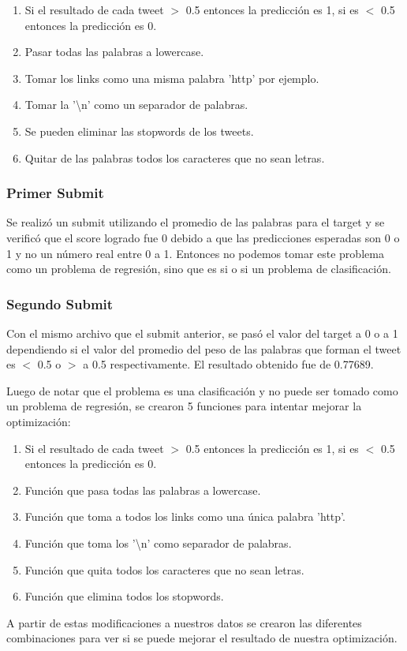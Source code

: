 \documentclass[12pt]{article}
\begin{document}
\begin{enumerate}
  \item Si el resultado de cada tweet $>$ 0.5 entonces la predicción es 1, si es $<$ 0.5 entonces la predicción es 0.
  \item Pasar todas las palabras a lowercase.
  \item Tomar los links como una misma palabra 'http' por ejemplo.
  \item Tomar la '\textbackslash n' como un separador de palabras.
  \item Se pueden eliminar las stopwords de los tweets.
  \item Quitar de las palabras todos los caracteres que no sean letras.
\end{enumerate}

\subsubsection{Primer Submit}
Se realizó un submit utilizando el promedio de las palabras para el target y se verificó que el score logrado fue 0 debido a que las predicciones esperadas son 0 o 1 y no un número real entre 0 a 1.
Entonces no podemos tomar este problema como un problema de regresión, sino que es si o si un problema de clasificación.

\subsubsection{Segundo Submit}
Con el mismo archivo que el submit anterior, se pasó el valor del target a 0 o a 1 dependiendo si el valor del promedio del peso de las palabras que forman el tweet es $<$ 0.5 o $>$ a 0.5 respectivamente.
El resultado obtenido fue de 0.77689.

Luego de notar que el problema es una clasificación y no puede ser tomado como un problema de regresión, se crearon 5 funciones para intentar mejorar la optimización:

\begin{enumerate}
  \item Si el resultado de cada tweet $>$ 0.5 entonces la predicción es 1, si es $<$ 0.5 entonces la predicción es 0.
  \item Función que pasa todas las palabras a lowercase.
  \item Función que toma a todos los links como una única palabra 'http'.
  \item Función que toma los '\textbackslash n' como separador de palabras.
  \item Función que quita todos los caracteres que no sean letras.
  \item Función que elimina todos los stopwords.
\end{enumerate}
A partir de estas modificaciones a nuestros datos se crearon las diferentes combinaciones para ver si se puede mejorar el resultado de nuestra optimización.
\end{document}
